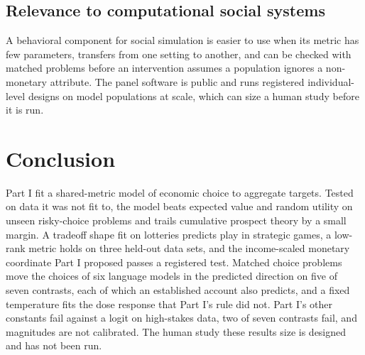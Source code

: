 \documentclass[journal]{IEEEtran}
\begin{document}
\subsection{Relevance to computational social systems}
A behavioral component for social simulation is easier to use when its metric has few parameters, transfers from one setting to another, and can be checked with matched problems before an intervention assumes a population ignores a non-monetary attribute.
The panel software is public and runs registered individual-level designs on model populations at scale, which can size a human study before it is run.

\section{Conclusion}
\label{sec:conclusion}

Part I fit a shared-metric model of economic choice to aggregate targets.
Tested on data it was not fit to, the model beats expected value and random utility on unseen risky-choice problems and trails cumulative prospect theory by a small margin.
A tradeoff shape fit on lotteries predicts play in strategic games, a low-rank metric holds on three held-out data sets, and the income-scaled monetary coordinate Part I proposed passes a registered test.
Matched choice problems move the choices of six language models in the predicted direction on five of seven contrasts, each of which an established account also predicts, and a fixed temperature fits the dose response that Part I's rule did not.
Part I's other constants fail against a logit on high-stakes data, two of seven contrasts fail, and magnitudes are not calibrated.
The human study these results size is designed and has not been run.

\end{document}
